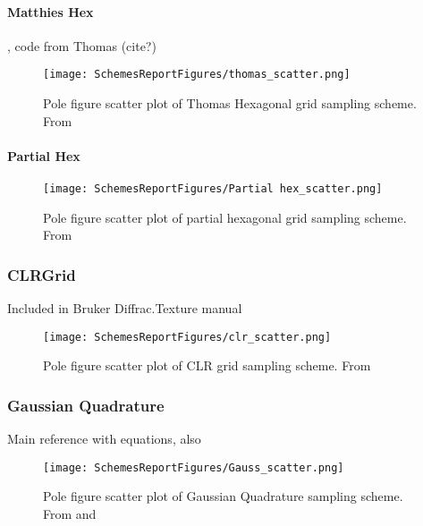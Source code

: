 \documentclass{article}
\begin{document}
\paragraph{Matthies Hex}
\cite{matthies_optimization_1992}, code from Thomas (cite?)

\begin{figure}[H]
    \centering
    \texttt{[image: SchemesReportFigures/thomas\_scatter.png]}
    \caption{Pole figure scatter plot of Thomas Hexagonal grid sampling scheme. From \cite{matthies_optimization_1992}}
\end{figure}

\paragraph{Partial Hex}

\begin{figure}[H]
    \centering
    \texttt{[image: SchemesReportFigures/Partial hex\_scatter.png]}
    \caption{Pole figure scatter plot of partial hexagonal grid sampling scheme. From \cite{rizzie_elaboration_2008}}
\end{figure}


\subsubsection{CLRGrid}

Included in Bruker Diffrac.Texture manual \cite{bruker_axs_gmbh_diffractexture_2016}

\begin{figure}[H]
    \centering
    \texttt{[image: SchemesReportFigures/clr\_scatter.png]}
    \caption{Pole figure scatter plot of CLR grid sampling scheme. From \cite{bruker_axs_gmbh_diffractexture_2016}}
\end{figure}


\subsubsection{Gaussian Quadrature}

\cite{lan_generalized_2015} Main reference with equations, also \cite{lan_private_2017}

\begin{figure}[H]
    \centering
    \texttt{[image: SchemesReportFigures/Gauss\_scatter.png]}
    \caption{Pole figure scatter plot of Gaussian Quadrature sampling scheme. From \cite{lan_generalized_2015} and \cite{lan_private_2017}}
\end{figure}
\end{document}
